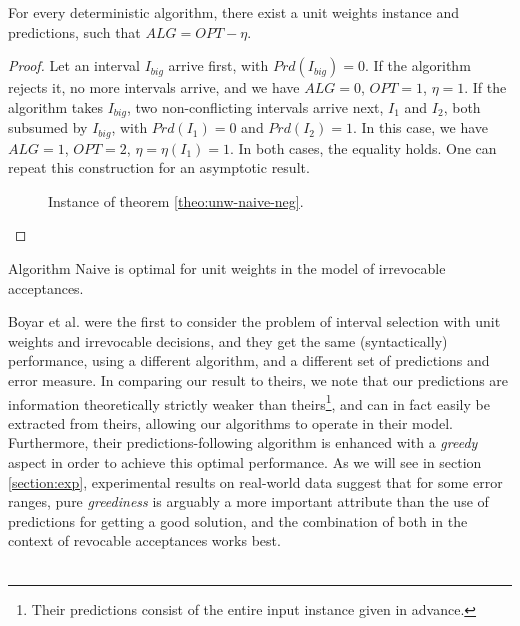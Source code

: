 \begin{theorem}
    For every deterministic algorithm, there exist a unit weights instance and predictions, such that $ALG = OPT - \eta$.
    \label{theo:unw-naive-neg}
\end{theorem}
\begin{proof}
    Let an interval $I_{big}$ arrive first, with $Prd(I_{big}) = 0$. If the algorithm rejects it, no more intervals arrive, and we have $ALG = 0$, $OPT = 1$, $\eta = 1$. If the algorithm takes $I_{big}$, two non-conflicting intervals arrive next, $I_{1}$ and $I_{2}$, both subsumed by $I_{big}$, with $Prd(I_{1}) = 0$ and $Prd(I_{2})=1$. In this case, we have $ALG = 1$, $OPT = 2$, $\eta = \eta(I_1) = 1$. In both cases, the equality holds. One can repeat this construction for an asymptotic result.
    \begin{figure}[h] %
        \centering
        \caption{Instance of theorem \ref{theo:unw-naive-neg}.}
        \label{fig:neg-unit-irrev}
    \end{figure}
\end{proof}

\begin{corollary}
    Algorithm Naive is optimal for unit weights in the model of irrevocable acceptances.
\end{corollary}
Boyar et al. \cite{boyar2023online} were the first to consider the problem of interval selection with unit weights and irrevocable decisions, and they get the same (syntactically) performance, using a different algorithm, and a different set of predictions and error measure. In comparing our result to theirs, we note that our predictions are information theoretically strictly weaker than theirs\footnote{Their predictions consist of the entire input instance given in advance.}, and can in fact easily be extracted from theirs, allowing our algorithms to operate in their model. Furthermore, their predictions-following algorithm is enhanced with a \textit{greedy} aspect in order to achieve this optimal performance. As we will see in section \ref{section:exp}, experimental results on real-world data suggest that for some error ranges, pure \textit{greediness} is arguably a more important attribute than the use of predictions for getting a good solution, and the combination of both in the context of revocable acceptances works best.\\\\

